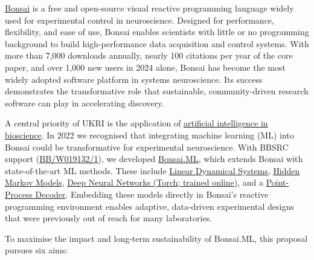 \href{https://bonsai-rx.org/}{Bonsai} is a free and open-source visual reactive
programming language widely used for experimental control in neuroscience.
Designed for performance, flexibility, and ease of use, Bonsai enables
scientists with little or no programming background to build high-performance
data acquisition and control systems. With more than 7,000 downloads annually,
nearly 100 citations per year of the core paper, and over 1,000 new users in
2024 alone, Bonsai has become the most widely adopted software platform in
systems neuroscience. Its success demonstrates the transformative role that
sustainable, community-driven research software can play in accelerating
discovery.  

A central priority of UKRI is the application of
\href{https://www.ukri.org/what-we-do/browse-our-areas-of-investment-and-support/artificial-intelligence-in-bioscience/}{artificial
intelligence in bioscience}. In 2022 we recognised that integrating machine
learning (ML) into Bonsai could be transformative for experimental
neuroscience. With BBSRC support
(\href{https://gow.bbsrc.ukri.org/grants/AwardDetails.aspx?FundingReference=BB%2FW019132%2F1}{BB/W019132/1}),
we developed \href{https://bonsai-rx.org/machinelearning/}{Bonsai.ML}, which
extends Bonsai with state-of-the-art ML methods. These include
\href{https://bonsai-rx.org/machinelearning/examples/examples/LinearDynamicalSystems/README.html}{Linear
Dynamical Systems},
\href{https://bonsai-rx.org/machinelearning/examples/examples/HiddenMarkovModels/README.html}{Hidden
Markov Models},
\href{https://bonsai-rx.org/machinelearning/examples/examples/Torch/NeuralNetsTrainedOnline/README.html}{Deep
Neural Networks (Torch; trained online)}, and a
\href{https://bonsai-rx.org/machinelearning/examples/examples/PointProcessDecoder/DecodePositionFromHippocampusSortedUnits/README.html}{Point-Process
Decoder}. Embedding these models directly in Bonsai’s reactive programming
environment enables adaptive, data-driven experimental designs that were
previously out of reach for many laboratories.  

To maximise the impact and long-term sustainability of Bonsai.ML, this proposal
pursues six aims:  


